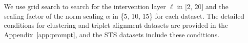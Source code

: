\documentclass[11pt]{article}
\begin{document}
We use grid search to search for the intervention layer $\ell$ in [2, 20] and the scaling factor of the norm scaling $\alpha$ in \{5, 10, 15\} for each dataset.
The detailed conditions for clustering and triplet alignment datasets are provided in the Appendix~\ref{app:prompt}, and the STS datasets include these conditions.



\end{document}
